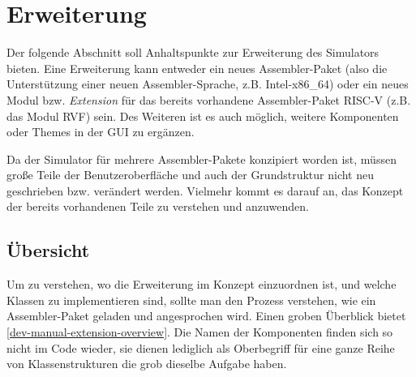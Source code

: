 
\section{Erweiterung}
\label{dev:extension}

Der folgende Abschnitt soll Anhaltspunkte zur Erweiterung des Simulators bieten.
Eine Erweiterung kann entweder ein neues Assembler-Paket (also die Unterstützung
einer neuen Assembler-Sprache, z.B. Intel-x86\_64) oder ein neues Modul bzw.
\emph{Extension} für das bereits vorhandene Assembler-Paket RISC-V (z.B. das
Modul RVF) sein. Des Weiteren ist es auch möglich, weitere Komponenten oder
Themes in der GUI zu ergänzen.

Da der Simulator für mehrere Assembler-Pakete konzipiert worden ist, müssen
große Teile der Benutzeroberfläche und auch der Grundstruktur nicht neu
geschrieben bzw. verändert werden. Vielmehr kommt es darauf an, das Konzept der
bereits vorhandenen Teile zu verstehen und anzuwenden.

\subsection{Übersicht}

Um zu verstehen, wo die Erweiterung im Konzept einzuordnen ist, und welche
Klassen zu implementieren sind, sollte man den Prozess verstehen, wie ein
Assembler-Paket geladen und angesprochen wird. Einen groben Überblick bietet
\autoref{dev-manual-extension-overview}. Die Namen der Komponenten finden sich
so nicht im Code wieder, sie dienen lediglich als Oberbegriff für eine ganze
Reihe von Klassenstrukturen die grob dieselbe Aufgabe haben.

